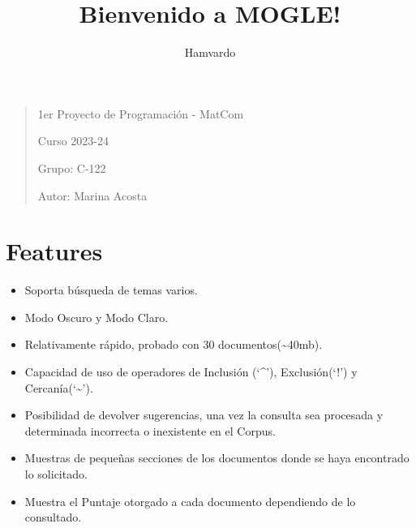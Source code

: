 \documentclass{article}
\begin{document}
\title{Bienvenido a MOGLE!}
\author{Hamvardo}
\maketitle

\begin{figure}[h]
\end{figure}

\begin{quote}
1er Proyecto de Programación - MatCom

Curso 2023-24

Grupo: C-122

Autor: Marina Acosta
\end{quote}

\section*{Features}\label{sec:ent}
\begin{itemize}
    \item
  Soporta búsqueda de temas varios.
    \item
  Modo Oscuro y Modo Claro.
    \item
  Relativamente rápido, probado con 30 documentos(\textasciitilde40mb).
    \item
  Capacidad de uso de operadores de Inclusión (`\^{}'), Exclusión(`!') y
  Cercanía(`\textasciitilde{}').
    \item
  Posibilidad de devolver sugerencias, una vez la consulta sea procesada
  y determinada incorrecta o inexistente en el Corpus.
    \item
  Muestras de pequeñas secciones de los documentos donde se haya
  encontrado lo solicitado.
    \item
  Muestra el Puntaje otorgado a cada documento dependiendo de lo
  consultado.
\end{itemize}
\end{document}
